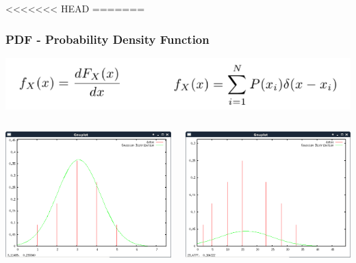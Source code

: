 \documentclass{beamer}
\begin{document}
<<<<<<< HEAD
=======
\begin{frame}
\frametitle{PDF - Probability Density Function}
\begin{center}
\includegraphics[scale=0.35]{pdf1}
\end{center}
\begin{columns}
\begin{column}{0.5\textwidth}
\includegraphics[scale=0.25]{pdf2}
\end{column}
\begin{column}{0.5\textwidth}
\includegraphics[scale=0.25]{pdf3}
\end{column}
\end{columns}
\end{frame}
\end{document}
